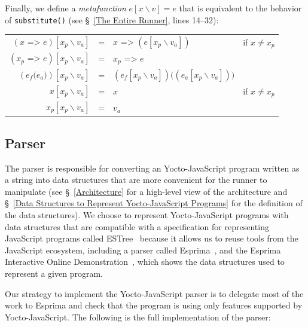 \documentclass[12pt, oneside]{book}
\begin{document}
\begin{mdframed}[frametitle = {Advanced}]
Finally, we define a \emph{metafunction} $e[x \backslash v] = e$ that is equivalent to the behavior of \texttt{substitute()} (see §~\ref{The Entire Runner}, lines 14–32):

\begin{center}
\begin{tabular}{rcll}
$(x\texttt{ => }e)[x_{p} \backslash v_{a}]$ & = & $x\texttt{ => }(e[x_{p} \backslash v_{a}])$ & if $x \neq x_{p}$ \\
$(x_{p}\texttt{ => }e)[x_{p} \backslash v_{a}]$ & = & $x_{p}\texttt{ => }e$ & \\
$(e_{f}\texttt{(}e_{a}\texttt{)})[x_{p} \backslash v_{a}]$ & = & $(e_{f}[x_{p} \backslash v_{a}])\texttt{(}(e_{a}[x_{p} \backslash v_{a}])\texttt{)}$ & \\
$x[x_{p} \backslash v_{a}]$ & = & $x$ & if $x \neq x_{p}$ \\
$x_{p}[x_{p} \backslash v_{a}]$ & = & $v_{a}$ & \\
\end{tabular}
\end{center}
\end{mdframed}

\subsection{Parser}
\label{Parser}

The parser is responsible for converting an Yocto-JavaScript program written as a string into data structures that are more convenient for the runner to manipulate (see §~\ref{Architecture} for a high-level view of the architecture and §~\ref{Data Structures to Represent Yocto-JavaScript Programs} for the definition of the data structures). We choose to represent Yocto-JavaScript programs with data structures that are compatible with a specification for representing JavaScript programs called ESTree~\cite{estree, estree-types} because it allows us to reuse tools from the JavaScript ecosystem, including a parser called Esprima~\cite{esprima}, and the Esprima Interactive Online Demonstration~\cite{esprima-demonstration}, which shows the data structures used to represent a given program.

Our strategy to implement the Yocto-JavaScript parser is to delegate most of the work to Esprima and check that the program is using only features supported by Yocto-JavaScript. The following is the full implementation of the parser:
\end{document}
